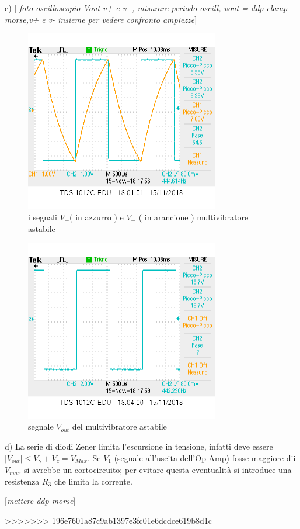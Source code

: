 \documentclass[10pt,a4paper]{article}
\newcommand{\rem}[1]{[\emph{#1}]}
\begin{document}
c) \rem{ foto oscilloscopio Vout v+ e v- , misurare periodo oscill,  vout = ddp clamp morse,v+ e v- insieme per vedere confronto ampiezze}
\begin{figure}[h]
	\begin{center}
		
			\includegraphics[scale=0.8]{v+_v-.png}
		\caption{\small i segnali $V_+$( in azzurro ) e $ V_-$ ( in arancione )  multivibratore astabile}

		\label{fig:v+v-}
	\end{center}

\end{figure}



\begin{figure}[h]
	\begin{center}
		
			\includegraphics[scale=0.8]{vout_punto2.png}
		\caption{\small segnale $V_{out}$ del multivibratore astabile }

		\label{fig:v+v-}
	\end{center}

\end{figure}


d) La serie di  diodi  Zener limita l'escursione in tensione, infatti deve essere $|V_{out}| \le V_{\gamma} +V_{z} = V_{Max}$.
 Se $V_{1}$ (segnale all'uscita dell'Op-Amp) fosse maggiore dii $V_{max}$ si avrebbe un cortocircuito; per evitare questa eventualità si introduce  una resistenza $R_3$ che limita la corrente.

\rem{mettere ddp morse}





>>>>>>> 196e7601a87c9ab1397e3fc01e6dcdce619b8d1c
\end{document}
